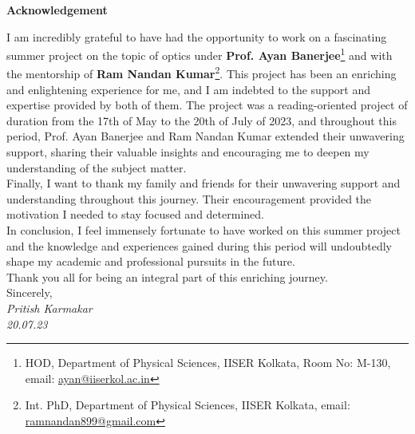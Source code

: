 \documentclass[11pt,a4paper]{article}
\numberwithin{equation}{section}
\begin{document}
\begin{titlepage}
		\thispagestyle{empty}
		{\centering\Huge\bfseries Acknowledgement}
		\vspace{12mm}
		\begin{flushleft}
		\Large
		\hspace{7mm}I am incredibly grateful to have had the opportunity to work on a fascinating summer project on the topic of optics under  \textbf{Prof. Ayan Banerjee}\footnote{HOD, Department of Physical Sciences, IISER Kolkata, Room No: M-130, email: \href{mailto:ayan@iiserkol.ac.in}{ayan@iiserkol.ac.in}} and with the mentorship of \textbf{Ram Nandan Kumar}\footnote{Int. PhD, Department of Physical Sciences, IISER Kolkata, email: \href{mailto:ramnandan899@gmail.com}{ramnandan899@gmail.com}}. This project has been an enriching and enlightening experience for me, and I am indebted to the support and expertise provided by both of them.  The project was a reading-oriented project of duration from the 17th of May to the 20th of July of 2023, and throughout this period, {Prof. Ayan Banerjee} and {Ram Nandan Kumar} extended their unwavering support, sharing their valuable insights and encouraging me to deepen my understanding of the subject matter.\\
		\vspace{5mm}
		\hspace{7mm}Finally, I want to thank my family and friends for their unwavering support and understanding throughout this journey. Their encouragement provided the motivation I needed to stay focused and determined.\\
		\vspace{5mm}
		\hspace{7mm}In conclusion, I feel immensely fortunate to have worked on this summer project and the knowledge and experiences gained during this period will undoubtedly shape my academic and professional pursuits in the future.\\
		\vspace{5mm}
		\hspace{7mm}Thank you all for being an integral part of this enriching journey.\\
		\vspace{5mm}
		Sincerely,\\
		\vspace{5mm}
		\textit{\LARGE Pritish Karmakar}\\
		\textit{20.07.23} 
		\end{flushleft}
		\newpage
		
		
		
		\tableofcontents
		\clearpage
		\listoffigures
		\listoftables
		
	\end{titlepage}
\end{document}
